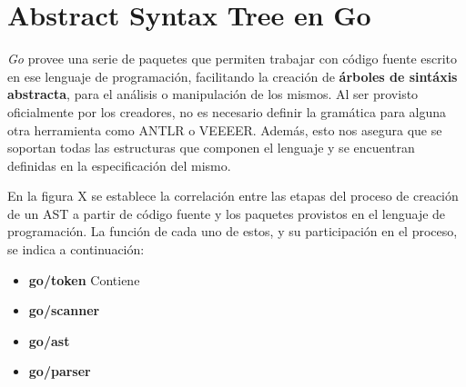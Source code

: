 \section{Abstract Syntax Tree en Go}
\textit{Go} provee una serie de paquetes que permiten trabajar con código fuente escrito en ese lenguaje de programación, facilitando la creación de \textbf{árboles de sintáxis abstracta}, para el análisis o manipulación de los mismos.
Al ser provisto oficialmente por los creadores, no es necesario definir la gramática para alguna otra herramienta como ANTLR o VEEEER.
Además, esto nos asegura que se soportan todas las estructuras que componen el lenguaje y se encuentran definidas en la especificación del mismo.

En la figura X se establece la correlación entre las etapas del proceso de creación de un AST a partir de código fuente y los paquetes provistos en el lenguaje de programación.
La función de cada uno de estos, y su participación en el proceso, se indica a continuación:
\begin{itemize}
  \item \textbf{go/token} Contiene
  
  \item \textbf{go/scanner}
  
  \item \textbf{go/ast}
  
  \item \textbf{go/parser}
\end{itemize}
